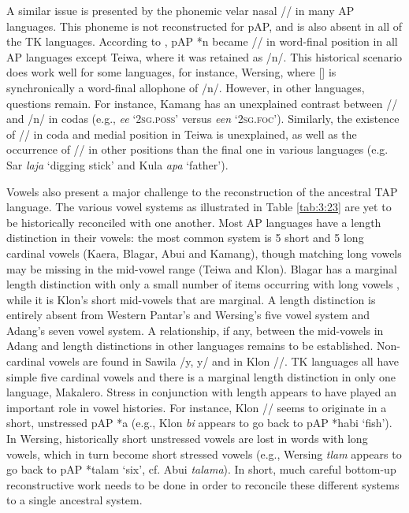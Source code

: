 A similar issue is presented by the phonemic velar nasal /{\ng}/ in many AP languages. This phoneme is not reconstructed for pAP, and is also absent in all of the TK languages. According to \citet{HoltonRobinsonTVhistory}, pAP *n became /{\ng}/ in word-final position in all AP languages except Teiwa, where it was retained as /n/. This historical scenario does work well for some languages, for instance, Wersing, where [{\ng}] is synchronically a word-final allophone of /n/. However, in other languages, questions remain. For instance, Kamang has an unexplained contrast between /{\ng}/ and /n/ in codas (e.g., \textit{ee{\ng}} `\textsc{2sg.poss'} versus \textit{een} `\textsc{2sg.foc'}). Similarly, the existence of /{\ng}/ in coda and medial position in Teiwa is unexplained, as well as the occurrence of /{\ng}/ in other positions than the final one in various languages (e.g. Sar \textit{la{\ng}ja} `digging stick' and Kula \textit{{\ng}apa} `father'). 

Vowels also present a major challenge to the reconstruction of the ancestral TAP language. The various vowel systems as illustrated in Table \ref{tab:3:23} are yet to be historically reconciled with one another. Most AP languages have a length distinction in their vowels: the most common system is 5 short and 5 long cardinal vowels (Kaera, Blagar, Abui and Kamang), though matching long vowels may be missing in the mid-vowel range (Teiwa and Klon). Blagar has a marginal length distinction with only a small number of items occurring with long vowels \citep{Steinhauerta}, while it is Klon's short mid-vowels that are marginal. A length distinction is entirely absent from Western Pantar's and Wersing's five vowel system and Adang's seven vowel system. A relationship, if any, between the mid-vowels in Adang and length distinctions in other languages remains to be established. Non-cardinal vowels are found in Sawila /y, y{\textlengthmark}/ and in Klon /{\textschwa}/. TK languages all have simple five cardinal vowels and there is a marginal length distinction in only one language, Makalero. Stress in conjunction with length appears to have played an important role in vowel histories. For instance, Klon /{\textschwa}/ seems to originate in a short, unstressed pAP *a (e.g., Klon \textit{{\textschwa}bi} appears to go back to pAP *ha{\textprimstress}bi `fish'). In Wersing, historically short unstressed vowels are lost in words with long vowels, which in turn become short stressed vowels (e.g., Wersing \textit{tlam} appears to go back to pAP *tala{\textlengthmark}m `six', cf. Abui \textit{tala{\textlengthmark}ma}). In short, much careful bottom-up reconstructive work needs to be done in order to reconcile these different systems to a single ancestral system.
 

